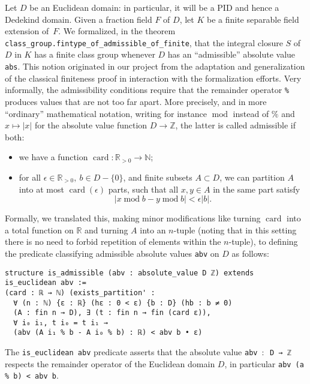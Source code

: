 \documentclass[sn-mathphys]{sn-jnl}%
\newcommand{\lean}[1]{\texttt{#1}\xspace}
\newcommand{\N}{\mathbb{N}}
\renewcommand{\R}{\mathbb{R}}
\renewcommand{\Z}{\mathbb{Z}}
\begin{document}
Let $D$ be an Euclidean domain: in particular, it will be a PID and hence a Dedekind domain. Given a fraction field $F$ of $D$, let $K$ be a finite separable field extension of~$F$.
We formalized, in the theorem \lean{class\_group.fintype\_of\_\-admissible\_\-of\_finite}, that the integral closure $S$ of $D$ in $K$ has a finite class group whenever $D$ has an ``admissible'' absolute value \lean{abs}.
This notion originated in our project from the adaptation and generalization of the classical finiteness proof in interaction with the formalization efforts.
Very informally, the admissibility conditions require that the remainder operator \lean{\%} produces values that are not too far apart.
More precisely, and in more ``ordinary'' mathematical notation, writing for instance $\operatorname{mod}$ instead of $\%$ and $x \mapsto \lvert x \rvert $ for the absolute value function $D \to \Z$, the latter is called admissible if both:
\begin{itemize}
\item we have a function $\operatorname{card}: \R_{>0} \to \N$;
\item for all $\epsilon \in \R_{>0},\ b \in D-\{0\}$, and finite subsets $A \subset D$,
we can partition $A$
into at most $\operatorname{card}(\epsilon)$ parts, such that all
$x, y \in A$ in the same part satisfy
\[ \lvert x \operatorname{mod} b - y \operatorname{mod} b \rvert < \epsilon \lvert b \rvert.\]
\end{itemize}
Formally, we translated this, making minor modifications like turning $\operatorname{card}$ into a total function on $\R$ and turning $A$ into an $n$-tuple (noting that in this setting there is no need to forbid repetition of elements within the $n$-tuple),
to defining the predicate classifying admissible absolute values \lean{abv} on $D$ as follows:
\pagebreak[3] %
\begin{lstlisting}
structure is_admissible (abv : absolute_value D ℤ) extends is_euclidean abv :=
(card : ℝ → ℕ) (exists_partition' :
  ∀ (n : ℕ) {ε : ℝ} (hε : 0 < ε) {b : D} (hb : b ≠ 0)
  (A : fin n → D), ∃ (t : fin n → fin (card ε)),
  ∀ i₀ i₁, t i₀ = t i₁ →
  (abv (A i₁ % b - A i₀ % b) : ℝ) < abv b • ε)
\end{lstlisting}
The \lean{is\_euclidean abv} predicate asserts that the absolute value \lean{abv $:$ D → ℤ} respects the remainder operator of the Euclidean domain $D$, in particular \lean{abv (a \% b) < abv b}.
\end{document}
